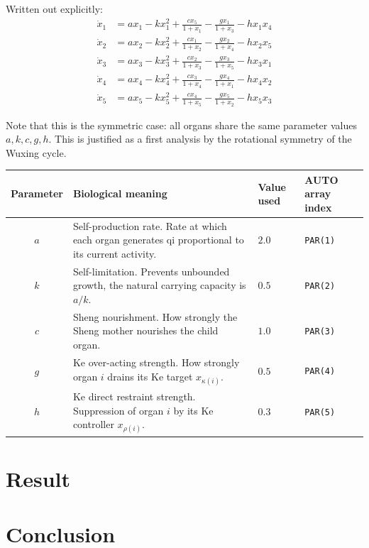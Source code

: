 \documentclass{article}
\begin{document}
Written out explicitly:
\begin{align*}
\dot{x}_1 &= ax_1 - kx_1^2 + \frac{cx_5}{1+x_1} - \frac{gx_1}{1+x_3} - hx_1x_4 \\
\dot{x}_2 &= ax_2 - kx_2^2 + \frac{cx_1}{1+x_2} - \frac{gx_2}{1+x_4} - hx_2x_5 \\
\dot{x}_3 &= ax_3 - kx_3^2 + \frac{cx_2}{1+x_3} - \frac{gx_3}{1+x_5} - hx_3x_1 \\
\dot{x}_4 &= ax_4 - kx_4^2 + \frac{cx_3}{1+x_4} - \frac{gx_4}{1+x_1} - hx_4x_2 \\
\dot{x}_5 &= ax_5 - kx_5^2 + \frac{cx_4}{1+x_5} - \frac{gx_5}{1+x_2} - hx_5x_3
\end{align*}

Note that this is the symmetric case: all organs share the same
parameter values $a, k, c, g, h$. This is justified as a first
analysis by the rotational symmetry of the Wuxing cycle.

\begin{center}
\begin{tabular}{c p{6cm} l l}
\toprule
Parameter & Biological meaning & Value used & AUTO array index \\
\midrule
$a$ & Self-production rate. Rate at which
      each organ generates qi proportional to its
      current activity. & $2.0$ & \texttt{PAR(1)} \\[4pt]
$k$ & Self-limitation. Prevents unbounded
      growth, the natural carrying capacity
      is $a/k$. & $0.5$ & \texttt{PAR(2)} \\[4pt]
$c$ & Sheng nourishment. How strongly the
      Sheng mother nourishes the child organ. & $1.0$ & \texttt{PAR(3)} \\[4pt]
$g$ & Ke over-acting strength. How strongly
      organ $i$ drains its Ke target $x_{\kappa(i)}$. & $0.5$ & \texttt{PAR(4)} \\[4pt]
$h$ & Ke direct restraint strength. Suppression of
      organ $i$ by its Ke controller
      $x_{\rho(i)}$. & $0.3$ & \texttt{PAR(5)} \\
\bottomrule
\end{tabular}
\end{center}


\section{Result}
\section{Conclusion}
\end{document}
